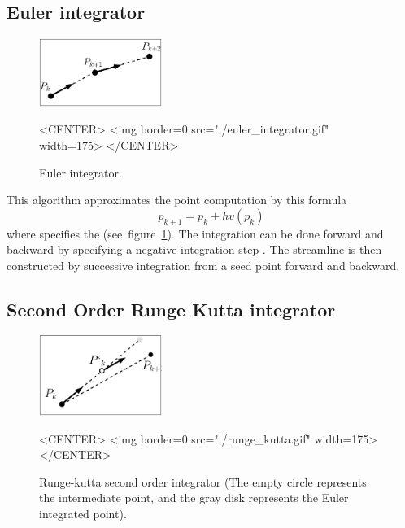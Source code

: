 \subsection{Euler integrator}

\begin{figure}[h!]
\begin{ccTexOnly}
\begin{center}
\includegraphics[width=4cm]{Stream_lines_2/euler_integrator}
\end{center}
\end{ccTexOnly}
\caption{Euler integrator.
\label{euler_fig}}
\begin{ccHtmlOnly}
<CENTER>
<img border=0 src="./euler_integrator.gif" width=175>
</CENTER>
\end{ccHtmlOnly}
\end{figure}

This algorithm approximates the point computation by this formula $$p_{k+1} = p_k + hv(p_k)$$ where  specifies the  (see~figure~\ref{euler_fig}). The integration can be done forward and backward by specifying a negative integration step . The streamline is then constructed by successive integration from a seed point forward and backward.

\subsection{Second Order Runge Kutta integrator}

\begin{figure}[h!]
\begin{ccTexOnly}
\begin{center}
\includegraphics[width=4cm]{Stream_lines_2/runge_kutta_integrator}
\end{center}
\end{ccTexOnly}
\caption{Runge-kutta second order integrator (The empty circle represents the intermediate point, and the gray disk represents the Euler integrated point).
\label{runge_kutta_fig}}
\begin{ccHtmlOnly}
<CENTER>
<img border=0 src="./runge_kutta.gif" width=175>
</CENTER>
\end{ccHtmlOnly}
\end{figure}

